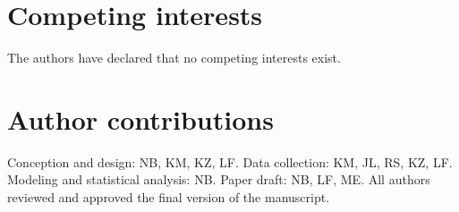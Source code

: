 \documentclass[fleqn,11pt]{wlscirep}
\begin{document}
\section*{Competing interests}
The authors have declared that no competing interests exist.

\section*{Author contributions}
Conception and design: NB, KM, KZ, LF. Data collection: KM, JL, RS, KZ, LF. Modeling and statistical analysis: NB. Paper draft: NB, LF, ME. All authors reviewed and approved the final version of the manuscript.

\newpage


\end{document}
